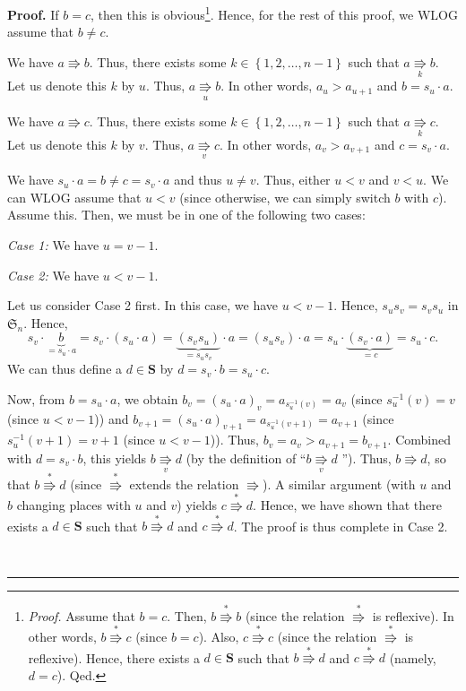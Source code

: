 \documentclass[numbers=enddot,12pt,final,onecolumn,notitlepage]{scrartcl}%
\theoremstyle{definition}
\newenvironment{proof}[1][Proof]{\noindent\textbf{#1.} }{\ \rule{0.5em}{0.5em}}
\begin{document}
\begin{proof}
If $b=c$, then this is obvious\footnote{\textit{Proof.} Assume that $b=c$.
Then, $b\overset{\ast}{\Rrightarrow}b$ (since the relation $\overset{\ast
}{\Rrightarrow}$ is reflexive). In other words, $b\overset{\ast}{\Rrightarrow
}c$ (since $b=c$). Also, $c\overset{\ast}{\Rrightarrow}c$ (since the relation
$\overset{\ast}{\Rrightarrow}$ is reflexive). Hence, there exists a
$d\in\mathbf{S}$ such that $b\overset{\ast}{\Rrightarrow}d$ and
$c\overset{\ast}{\Rrightarrow}d$ (namely, $d=c$). Qed.}. Hence, for the rest
of this proof, we WLOG assume that $b\neq c$.

We have $a\Rrightarrow b$. Thus, there exists some $k\in\left\{
1,2,\ldots,n-1\right\}  $ such that $a\underset{k}{\Rrightarrow}b$. Let us
denote this $k$ by $u$. Thus, $a\underset{u}{\Rrightarrow}b$. In other words,
$a_{u}>a_{u+1}$ and $b=s_{u}\cdot a$.

We have $a\Rrightarrow c$. Thus, there exists some $k\in\left\{
1,2,\ldots,n-1\right\}  $ such that $a\underset{k}{\Rrightarrow}c$. Let us
denote this $k$ by $v$. Thus, $a\underset{v}{\Rrightarrow}c$. In other words,
$a_{v}>a_{v+1}$ and $c=s_{v}\cdot a$.

We have $s_{u}\cdot a=b\neq c=s_{v}\cdot a$ and thus $u\neq v$. Thus, either
$u<v$ and $v<u$. We can WLOG assume that $u<v$ (since otherwise, we can simply
switch $b$ with $c$). Assume this. Then, we must be in one of the following
two cases:

\textit{Case 1:} We have $u=v-1$.

\textit{Case 2:} We have $u<v-1$.

Let us consider Case 2 first. In this case, we have $u<v-1$. Hence,
$s_{u}s_{v}=s_{v}s_{u}$ in $\mathfrak{S}_{n}$. Hence,%
\[
s_{v}\cdot\underbrace{b}_{=s_{u}\cdot a}=s_{v}\cdot\left(  s_{u}\cdot
a\right)  =\underbrace{\left(  s_{v}s_{u}\right)  }_{=s_{u}s_{v}}\cdot
a=\left(  s_{u}s_{v}\right)  \cdot a=s_{u}\cdot\underbrace{\left(  s_{v}\cdot
a\right)  }_{=c}=s_{u}\cdot c.
\]
We can thus define a $d\in\mathbf{S}$ by $d=s_{v}\cdot b=s_{u}\cdot c$.

Now, from $b=s_{u}\cdot a$, we obtain $b_{v}=\left(  s_{u}\cdot a\right)
_{v}=a_{s_{u}^{-1}\left(  v\right)  }=a_{v}$ (since $s_{u}^{-1}\left(
v\right)  =v$ (since $u<v-1$)) and $b_{v+1}=\left(  s_{u}\cdot a\right)
_{v+1}=a_{s_{u}^{-1}\left(  v+1\right)  }=a_{v+1}$ (since $s_{u}^{-1}\left(
v+1\right)  =v+1$ (since $u<v-1$)). Thus, $b_{v}=a_{v}>a_{v+1}=b_{v+1}$.
Combined with $d=s_{v}\cdot b$, this yields $b\underset{v}{\Rrightarrow}d$ (by
the definition of \textquotedblleft$b\underset{v}{\Rrightarrow}d$%
\textquotedblright). Thus, $b\Rrightarrow d$, so that $b\overset{\ast
}{\Rrightarrow}d$ (since $\overset{\ast}{\Rrightarrow}$ extends the relation
$\Rrightarrow$). A similar argument (with $u$ and $b$ changing places with $u$
and $v$) yields $c\overset{\ast}{\Rrightarrow}d$. Hence, we have shown that
there exists a $d\in\mathbf{S}$ such that $b\overset{\ast}{\Rrightarrow}d$ and
$c\overset{\ast}{\Rrightarrow}d$. The proof is thus complete in Case 2.


\end{proof}
\end{document}
